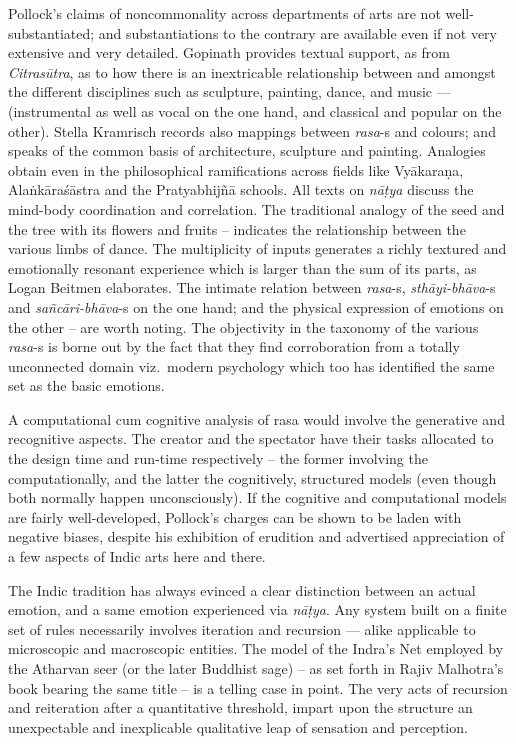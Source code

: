 Pollock’s claims of noncommonality across departments of arts are not well-substantiated; and substantiations to the contrary are available even if not very extensive and very detailed. Gopinath provides textual support, as from \textsl{Citrasūtra}, as to how there is an inextricable relationship between and amongst the different disciplines such as sculpture, painting, dance, and music --- (instrumental as well as vocal on the one hand, and classical and popular on the other). Stella Kramrisch records also mappings between \textsl{rasa}-s and colours; and speaks of the common basis of architecture, sculpture and painting. Analogies obtain even in the philosophical ramifications across fields like Vyākaraṇa, Alaṅkāraśāstra and the Pratyabhijñā schools. All texts on \textsl{nāṭya} discuss the mind-body coordination and correlation. The traditional analogy of the seed and the tree with its flowers and fruits -- indicates the relationship between the various limbs of dance. The multiplicity of inputs generates a richly textured and emotionally resonant experience which is larger than the sum of its parts, as Logan Beitmen elaborates. The intimate relation between \textsl{rasa}-s, \textsl{sthāyi-bhāva}-s and \textsl{sañcāri-bhāva}-s on the one hand; and the physical expression of emotions on the other -- are worth noting. The objectivity in the taxonomy of the various \textsl{rasa}-s is borne out by the fact that they find corroboration from a totally unconnected domain viz.\ modern psychology which too has identified the same set as the basic emotions.

A computational cum cognitive analysis of rasa would involve the generative and recognitive aspects. The creator and the spectator have their tasks allocated to the design time and run-time respectively -- the former involving the computationally, and the latter the cognitively, structured models (even though both normally happen unconsciously). If the cognitive and computational models are fairly well-developed,  Pollock’s charges can be shown to be laden with negative biases, despite his exhibition of erudition and advertised appreciation of a few aspects of Indic arts here and there.

The Indic tradition has always evinced a clear distinction between an actual emotion, and a same emotion experienced via \textsl{nāṭya}. Any system built on a finite set of rules necessarily involves iteration and recursion --- alike applicable to microscopic and macroscopic entities. The model of the Indra’s Net employed by the Atharvan seer (or the later Buddhist sage) -- as set forth in Rajiv Malhotra’s book bearing the same title -- is a telling case in point. The very acts of recursion and reiteration after a quantitative threshold, impart upon the structure an unexpectable and inexplicable qualitative leap of sensation and perception.

